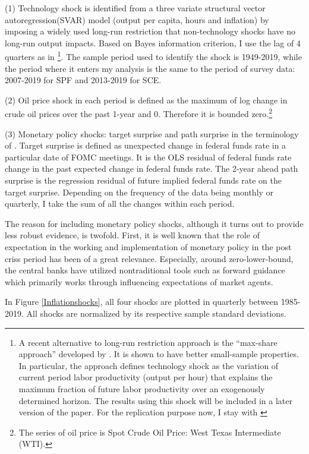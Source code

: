 \documentclass[]{article}
\begin{document}
	
	(1) Technology shock is identified from a three variate structural vector autoregression(SVAR) model  (output per capita, hours and inflation) by imposing a widely used long-run restriction that non-technology shocks have no long-run output impacts. Based on Bayes information criterion, I use the lag of 4 quarters as in \citet{coibion2012can} \footnote{A recent alternative to long-run restriction approach is the ``max-share approach'' developed by \citet{francis2014flexible}. It is shown to have better small-sample properties. In particular,  the approach defines technology shock as the variation of current period labor productivity (output per hour) that explains the maximum fraction of future labor productivity over an exogenously determined horizon. The results using this shock will be included in a later version of the paper. For the replication purpose now, I stay with \citet{gali1999technology}}. The sample period used to identify the shock is 1949-2019, while the period where it enters my analysis is the same to the period of survey data: 2007-2019 for SPF and 2013-2019 for SCE. 
	
	(2) Oil price shock in each period is defined as the maximum of log change in crude oil prices over the past 1-year and 0. Therefore it is bounded zero.\footnote{The series of oil price is Spot Crude Oil Price: West Texas Intermediate (WTI).}
	
	(3) Monetary policy shocks: target surprise and path surprise in the terminology of \citet{laseen2011anticipated}. Target surprise is defined as unexpected change in federal funds rate in a particular date of FOMC meetings. It is the OLS residual of federal funds rate change in the past expected change in federal funds rate. The 2-year ahead path surprise is the regression residual of future implied federal funds rate on the target surprise. Depending on the frequency of the data being monthly or quarterly, I take the sum of all the changes within each period.   
	
	The reason for including monetary policy shocks, although it turns out to provide less robust evidence, is twofold. First, it is well known that the role of expectation in the working and implementation of monetary policy in the post criss period has been of a great relevance. Especially, around zero-lower-bound, the central banks have utilized nontraditional tools such as forward guidance which primarily works through influencing expectations of market agents. 
	
	In Figure \ref{Inflationshocks}, all four shocks are plotted in quarterly between 1985-2019. All shocks are normalized by its respective sample standard deviations. 
	
\end{document}
